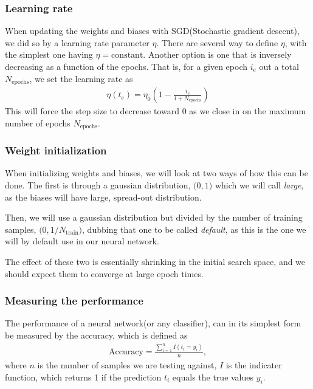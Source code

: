 \subsubsection{Learning rate}
When updating the weights and biases with SGD(Stochastic gradient descent), we did so by a learning rate parameter $\eta$. There are several way to define $\eta$, with the simplest one having $\eta=\mathrm{constant}$. Another option is one that is inversely decreasing as a function of the epochs. That is, for a given epoch $i_e$ out a total $N_\mathrm{epochs}$, we set the learning rate as
\begin{align}
    \eta(t_e) = \eta_0 (1 - \frac{i_e}{1 + N_\mathrm{epochs}})
    \label{eq:inverse-eta}
\end{align}
This will force the step size to decrease toward 0 as we close in on the maximum number of epochs $N_\mathrm{epochs}$.

\subsubsection{Weight initialization} \label{sec:nn-weights}
When initializing weights and biases, we will look at two ways of how this can be done. The first is through a gaussian distribution, $\mathcal(0, 1)$ which we will call \textit{large}, as the biases will have large, spread-out distribution.

Then, we will use a gaussian distribution but divided by the number of training samples, $\mathcal(0, 1/{N_\mathrm{train}})$, dubbing that one to be called \textit{default}, as this is the one we will by default use in our neural network.

The effect of these two is essentially shrinking in the initial search space, and we should expect them to converge at large epoch times.

\subsubsection{Measuring the performance}
The performance of a neural network(or any classifier), can in its simplest form be measured by the accuracy, which is defined as
\begin{align}
    \mathrm{Accuracy} = \frac{\sum^{n}_{i=1}I(t_i = y_i)}{n},
    \label{eq:mlp-accuracy}
\end{align}
where $n$ is the number of samples we are testing against, $I$ is the indicater function, which returns 1 if the prediction $t_i$ equals the true values $y_i$.